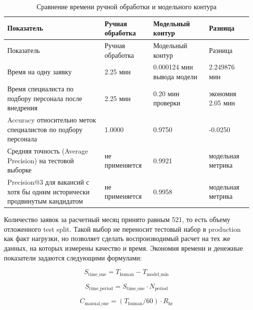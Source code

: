 \begin{small}
\begin{longtable}{|P{0.22\textwidth}|P{0.28\textwidth}|P{0.28\textwidth}|P{0.16\textwidth}|}
\caption{Сравнение времени ручной обработки и модельного контура}\label{tbl:deploy-time}\\
\hline
Показатель & Ручная обработка & Модельный контур & Разница \\
\hline
\endfirsthead
\hline
Показатель & Ручная обработка & Модельный контур & Разница \\
\hline
\endhead
\hline
\endfoot
\hline
\endlastfoot
Время на одну заявку & 2.25 мин & 0.000124 мин вывода модели & 2.249876 мин \\
\hline
Время специалиста по подбору персонала после внедрения & 2.25 мин & 0.20 мин проверки & экономия 2.05 мин \\
\hline
Accuracy относительно меток специалистов по подбору персонала & 1.0000 & 0.9750 & -0.0250 \\
\hline
Средняя точность (Average Precision) на тестовой выборке & не применяется & 0.9921 & модельная метрика \\
\hline
Precision@3 для вакансий с хотя бы одним исторически продвинутым кандидатом & не применяется & 0.9958 & модельная метрика \\
\end{longtable}
\end{small}

Количество заявок за расчетный месяц принято равным 521, то есть объему отложенного test split. Такой выбор не переносит тестовый набор в production как факт нагрузки, но позволяет сделать воспроизводимый расчет на тех же данных, на которых измерены качество и время. Экономия времени и денежные показатели задаются следующими формулами:

\begin{equation}
\label{eq:s_time_one-19}
S_{\text{time\_one}} = T_{\text{human}} - T_{\text{model\_min}}
\end{equation}

\begin{equation}
\label{eq:s_time_period-20}
S_{\text{time\_period}} = S_{\text{time\_one}} \cdot N_{\text{period}}
\end{equation}

\begin{equation}
\label{eq:c_manual_one-21}
C_{\text{manual\_one}} = (T_{\text{human}} / 60) \cdot R_{\text{hr}}
\end{equation}


